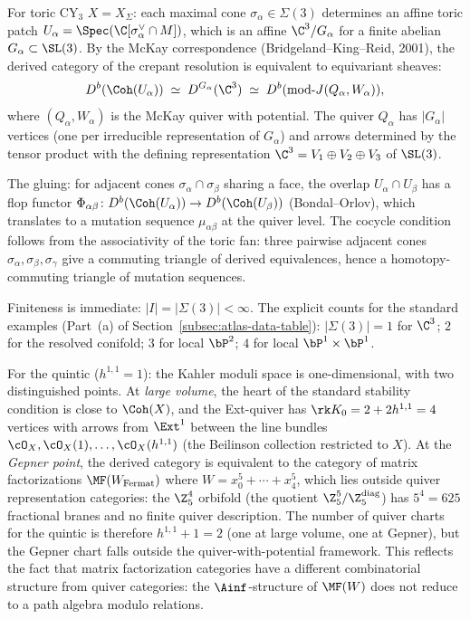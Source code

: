 \begin{remark}
For toric CY$_3$ $X = X_\Sigma$: each maximal cone $\sigma_\alpha \in \Sigma(3)$ determines an affine toric patch $U_\alpha = \Spec(\C[\sigma_\alpha^\vee \cap M])$, which is an affine $\C^3/G_\alpha$ for a finite abelian $G_\alpha \subset \SL(3)$. By the McKay correspondence (Bridgeland--King--Reid, 2001), the derived category of the crepant resolution is equivalent to equivariant sheaves:
\[
 D^b(\Coh(U_\alpha)) \;\simeq\; D^{G_\alpha}(\C^3) \;\simeq\; D^b(\mathrm{mod}\text{-}J(Q_\alpha, W_\alpha)),
\]
where $(Q_\alpha, W_\alpha)$ is the McKay quiver with potential. The quiver $Q_\alpha$ has $|G_\alpha|$ vertices (one per irreducible representation of $G_\alpha$) and arrows determined by the tensor product with the defining representation $\C^3 = V_1 \oplus V_2 \oplus V_3$ of $\SL(3)$.

The gluing: for adjacent cones $\sigma_\alpha \cap \sigma_\beta$ sharing a face, the overlap $U_\alpha \cap U_\beta$ has a flop functor $\Phi_{\alpha\beta} \colon D^b(\Coh(U_\alpha)) \to D^b(\Coh(U_\beta))$ (Bondal--Orlov), which translates to a mutation sequence $\mu_{\alpha\beta}$ at the quiver level. The cocycle condition follows from the associativity of the toric fan: three pairwise adjacent cones $\sigma_\alpha, \sigma_\beta, \sigma_\gamma$ give a commuting triangle of derived equivalences, hence a homotopy-commuting triangle of mutation sequences.

Finiteness is immediate: $|I| = |\Sigma(3)| < \infty$. The explicit counts for the standard examples (Part~(a) of Section~\ref{subsec:atlas-data-table}): $|\Sigma(3)| = 1$ for $\C^3$; $2$ for the resolved conifold; $3$ for local $\bP^2$; $4$ for local $\bP^1 \times \bP^1$.
\end{remark}

\begin{remark}
\label{rem:gepner-lv-dichotomy}
For the quintic ($h^{1,1} = 1$): the Kahler moduli space is one-dimensional, with two distinguished points. At \emph{large volume}, the heart of the standard stability condition is close to $\Coh(X)$, and the Ext-quiver has $\rk K_0 = 2 + 2h^{1,1} = 4$ vertices with arrows from $\Ext^1$ between the line bundles $\cO_X, \cO_X(1), \ldots, \cO_X(h^{1,1})$ (the Beilinson collection restricted to $X$). At the \emph{Gepner point}, the derived category is equivalent to the category of matrix factorizations $\MF(W_{\mathrm{Fermat}})$ where $W = x_0^5 + \cdots + x_4^5$, which lies outside quiver representation categories: the $\Z_5^4$ orbifold (the quotient $\Z_5^5/\Z_5^{\mathrm{diag}}$) has $5^4 = 625$ fractional branes and no finite quiver description. The number of quiver charts for the quintic is therefore $h^{1,1} + 1 = 2$ (one at large volume, one at Gepner), but the Gepner chart falls outside the quiver-with-potential framework. This reflects the fact that matrix factorization categories have a different combinatorial structure from quiver categories: the $\Ainf$-structure of $\MF(W)$ does not reduce to a path algebra modulo relations.
\end{remark}



